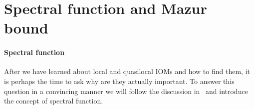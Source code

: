
\section{Spectral function and Mazur bound\label{sec:spectral function}}

\paragraph{Spectral function}After we have learned about local and quasilocal IOMs and how to find them, it is perhaps the 
time to ask why are they actually important. To answer this question in a convincing manner we 
will follow the discussion in~\textcite{Vidmar2021} and introduce the concept of spectral
function. 


